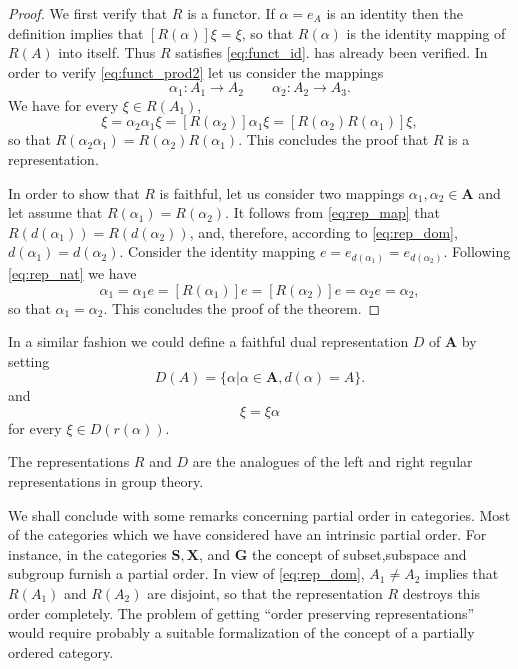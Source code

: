 \documentclass[11pt,a4paper]{report}
\begin{document}
\begin{proof}
	We first verify that $R$ is a functor. If $\alpha=e_A$ is an identity then the definition 
	implies that $[R(\alpha)]\xi=\xi$, so that $R(\alpha)$ is the identity mapping of $R(A)$ into itself. Thus
	$R$ satisfies \cref{eq:funct_id}.  has already been verified. In order to verify
	\cref{eq:funct_prod2} let us consider the mappings
	\begin{equation*}
		\alpha_1:A_1\rightarrow A_2\qquad\alpha_2:A_2\rightarrow A_3.
	\end{equation*}
	We have for every $\xi\in R(A_1)$,
	\begin{equation*}
		[R(\alpha_2\alpha_1)]\xi=\alpha_2\alpha_1\xi=[R(\alpha_2)]\alpha_1\xi=[R(\alpha_2)R(\alpha_1)]\xi,
	\end{equation*}
	so that $R(\alpha_2\alpha_1)=R(\alpha_2)R(\alpha_1)$. This concludes the proof that $R$ is a representation.

	In order to show that $R$ is faithful, let us consider two mappings $\alpha_1,\alpha_2\in\mathbf{A}$ and let
	assume that $R(\alpha_1)=R(\alpha_2)$. It follows from \cref{eq:rep_map} that $R(d(\alpha_1))=R(d(\alpha_2))$,
	and, therefore, according to \cref{eq:rep_dom}, $d(\alpha_1)=d(\alpha_2)$. Consider the identity mapping
	$e=e_{d(\alpha_1)}=e_{d(\alpha_2)}$. Following \cref{eq:rep_nat} we have
	\begin{equation*}
		\alpha_1 =\alpha_1 e = [R(\alpha_1)]e = [R(\alpha_2)]e = \alpha_2 e = \alpha_2,
	\end{equation*}
	so that $\alpha_1=\alpha_2$. This concludes the proof of the theorem.
\end{proof}

In a similar fashion we could define a faithful dual representation $D$ of $\mathbf{A}$ by setting
\begin{equation*}
	D(A)= \{\alpha | \alpha\in\mathbf{A}, d(\alpha)=A\}.
\end{equation*}
and
\begin{equation*}
	[D(\alpha)]\xi= \xi\alpha
\end{equation*}
for every $\xi\in D(r(\alpha))$.

The representations $R$ and $D$ are the analogues of the left and right regular representations in group theory.

We shall conclude with some remarks concerning partial order in categories. Most of the categories which we have
considered have an intrinsic partial order. For instance, in the categories $\mathbf{S,X}$, and $\mathbf{G}$ the
concept of subset,subspace and subgroup furnish a partial order. In view of \cref{eq:rep_dom}, $A_1\ne A_2$ implies
that $R(A_1)$ and $R(A_2)$ are disjoint, so that the representation $R$ destroys this order completely. The problem
of getting ``order preserving representations'' would require probably a suitable formalization of the concept of
a partially ordered category.
\end{document}
